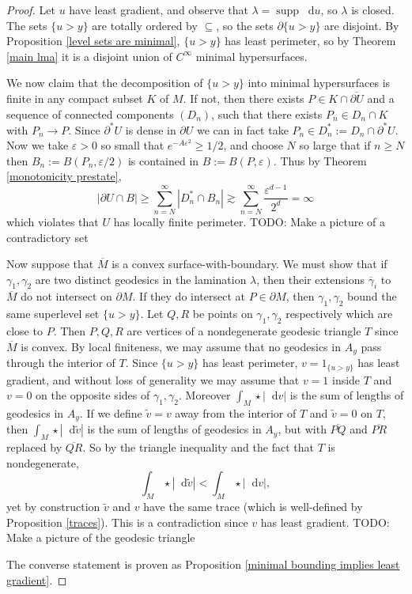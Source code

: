 \documentclass[reqno,12pt,letterpaper]{amsart}
\DeclareMathOperator{\supp}{supp}
\newcommand*\dif{\mathop{}\!\mathrm{d}}
\theoremstyle{definition}
\numberwithin{equation}{section}
\begin{document}
\begin{proof}
Let $u$ have least gradient, and observe that $\lambda = \supp \dif u$, so $\lambda$ is closed.
The sets $\{u > y\}$ are totally ordered by $\subseteq$, so the sets $\partial \{u > y\}$ are disjoint.
By Proposition \ref{level sets are minimal}, $\{u > y\}$ has least perimeter, so by Theorem \ref{main lma} it is a disjoint union of $C^\infty$ minimal hypersurfaces.

We now claim that the decomposition of $\{u > y\}$ into minimal hypersurfaces is finite in any compact subset $K$ of $M$.
If not, then there exists $P \in K \cap \overline{\partial U}$ and a sequence of connected components $(D_n)$, such that there exists $P_n \in D_n \cap K$ with $P_n \to P$.
Since $\partial^* U$ is dense in $\partial U$ we can in fact take $P_n \in D_n^* := D_n \cap \partial^* U$.
Now we take $\varepsilon > 0$ so small that $e^{-A\varepsilon^2} \geq 1/2$, and choose $N$ so large that if $n \geq N$ then $B_n := B(P_n, \varepsilon/2)$ is contained in $B := B(P, \varepsilon)$.
Thus by Theorem \ref{monotonicity prestate},
$$|\partial U \cap B| \geq \sum_{n=N}^\infty |D_n^* \cap B_n| \gtrsim  \sum_{n=N}^\infty \frac{\varepsilon^{d - 1}}{2^d} = \infty$$
which violates that $U$ has locally finite perimeter. TODO: Make a picture of a contradictory set

Now suppose that $\overline M$ is a convex surface-with-boundary.
We must show that if $\gamma_1, \gamma_2$ are two distinct geodesics in the lamination $\lambda$, then their extensions $\overline \gamma_i$ to $\overline M$ do not intersect on $\partial M$.
If they do intersect at $P \in \partial M$, then $\gamma_1, \gamma_2$ bound the same superlevel set $\{u > y\}$.
Let $Q, R$ be points on $\gamma_1, \gamma_2$ respectively which are close to $P$.
Then $P, Q, R$ are vertices of a nondegenerate geodesic triangle $T$ since $\overline M$ is convex.
By local finiteness, we may assume that no geodesics in $A_y$ pass through the interior of $T$.
Since $\{u > y\}$ has least perimeter, $v = 1_{\{u > y\}}$ has least gradient, and without loss of generality we may assume that $v = 1$ inside $T$ and $v = 0$ on the opposite sides of $\gamma_1, \gamma_2$.
Moreover $\int_M \star |\dif v|$ is the sum of lengths of geodesics in $A_y$.
If we define $\tilde v = v$ away from the interior of $T$ and $\tilde v = 0$ on $T$, then $\int_M \star |\dif \tilde v|$ is the sum of lengths of geodesics in $A_y$, but with $\overline{PQ}$ and $\overline{PR}$ replaced by $\overline{QR}$.
So by the triangle inequality and the fact that $T$ is nondegenerate,
$$\int_M \star |\dif \tilde v| < \int_M \star |\dif v|,$$
yet by construction $\tilde v$ and $v$ have the same trace (which is well-defined by Proposition \ref{traces}).
This is a contradiction since $v$ has least gradient. TODO: Make a picture of the geodesic triangle

The converse statement is proven as Proposition \ref{minimal bounding implies least gradient}.
\end{proof}
\end{document}
